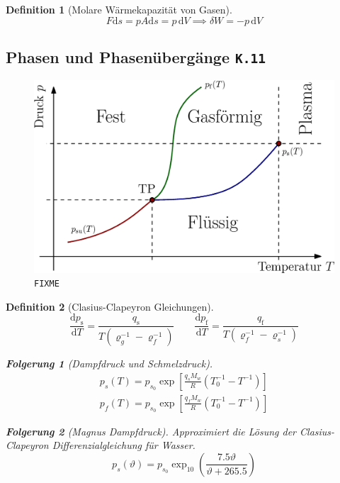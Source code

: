 \documentclass[a4paper, twocolumn]{article}
\numberwithin{equation}{section}
\theoremstyle{hsr-def}
\newtheorem{definition}{Definition}[section]
\theoremstyle{hsr-sub}
\newtheorem{result}{Folgerung}[definition]
\newcommand{\dd}[1]{\ensuremath{\mathrm{d}#1}}
\newcommand{\di}[1]{\,\dd{#1}}
\newcommand{\deriv}[2]{\ensuremath{\frac{\dd{#1}}{\dd{#2}}}}
\newcommand{\fromlecture}[1]{\textcolor{red!70!black}{\small\texttt{K.#1}}}
\begin{document}
\begin{definition}[Molare W\"armekapazit\"at von Gasen]
\[
    F\dd{s} = pA\dd{s} = p\di{V} \implies \delta W = -p\di{V}
\]
\end{definition}

\subsection{Phasen und Phasen\"uberg\"ange \fromlecture{11}}

\begin{figure}[h]
    \includegraphics[width=\linewidth]{fig/phase-diagram}%
    \caption{\tt FIXME}
\end{figure}

\begin{definition}[Clasius-Clapeyron Gleichungen]
\[
    \deriv{p_\text{s}}{T} =
        \frac{q_\text{s}}{T\left(\varrho_g^{-1} - \varrho_f^{-1}\right)}
    \qquad
    \deriv{p_\text{f}}{T} =
        \frac{q_\text{f}}{T\left(\varrho_f^{-1} - \varrho_s^{-1}\right)}
\]
\begin{result}[Dampfdruck und Schmelzdruck]
\begin{gather*}
    p_s(T) = p_{s_0} \exp\left[
        \frac{q_s M_w}{R} \left(
            T_0^{-1} - T^{-1}
        \right)
    \right] \\
    p_f(T) = p_{s_0} \exp\left[
        \frac{q_f M_w}{R} \left(
            T_0^{-1} - T^{-1}
        \right)
    \right]
\end{gather*}
\end{result}

\begin{result}[Magnus Dampfdruck] Approximiert die L\"osung der Clasius-Clapeyron Differenzialgleichung f\"ur Wasser.
\[
    p_s(\vartheta) = p_{s_0}
        \exp_{10}\left({\frac{7.5\vartheta}{\vartheta + 265.5}}\right)
\]
\end{result}
\end{definition}
\end{document}

